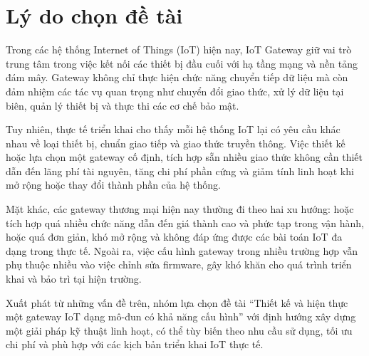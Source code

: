 \section{Lý do chọn đề tài}
    Trong các hệ thống Internet of Things (IoT) hiện nay, IoT Gateway giữ vai trò trung tâm trong việc kết nối các thiết bị đầu cuối với hạ tầng mạng và nền tảng đám mây. Gateway không chỉ thực hiện chức năng chuyển tiếp dữ liệu mà còn đảm nhiệm các tác vụ quan trọng như chuyển đổi giao thức, xử lý dữ liệu tại biên, quản lý thiết bị và thực thi các cơ chế bảo mật.

    Tuy nhiên, thực tế triển khai cho thấy mỗi hệ thống IoT lại có yêu cầu khác nhau về loại thiết bị, chuẩn giao tiếp và giao thức truyền thông. Việc thiết kế hoặc lựa chọn một gateway cố định, tích hợp sẵn nhiều giao thức không cần thiết dẫn đến lãng phí tài nguyên, tăng chi phí phần cứng và giảm tính linh hoạt khi mở rộng hoặc thay đổi thành phần của hệ thống.

    Mặt khác, các gateway thương mại hiện nay thường đi theo hai xu hướng: hoặc tích hợp quá nhiều chức năng dẫn đến giá thành cao và phức tạp trong vận hành, hoặc quá đơn giản, khó mở rộng và không đáp ứng được các bài toán IoT đa dạng trong thực tế. Ngoài ra, việc cấu hình gateway trong nhiều trường hợp vẫn phụ thuộc nhiều vào việc chỉnh sửa firmware, gây khó khăn cho quá trình triển khai và bảo trì tại hiện trường.

    Xuất phát từ những vấn đề trên, nhóm lựa chọn đề tài “Thiết kế và hiện thực một gateway IoT dạng mô-đun có khả năng cấu hình” với định hướng xây dựng một giải pháp kỹ thuật linh hoạt, có thể tùy biến theo nhu cầu sử dụng, tối ưu chi phí và phù hợp với các kịch bản triển khai IoT thực tế.